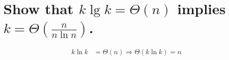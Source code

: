 \section[Problem 3]{Show that $k \lg k = \Theta(n)$ implies $k = \Theta\left(\frac{n}{n \ln n}\right)$.}
\begin{align*}
	k \ln k &= \Theta(n) \Longrightarrow \Theta(k \ln k) = n \\
\end{align*}

